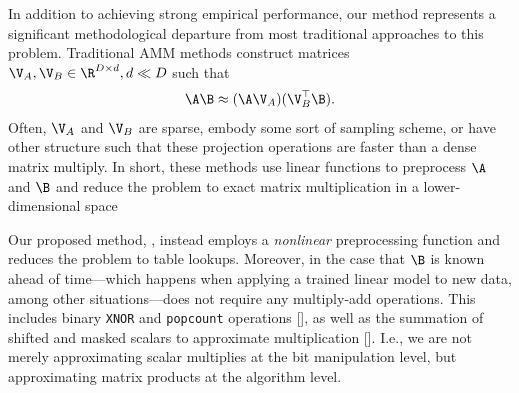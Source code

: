 
In addition to achieving strong empirical performance, our method represents a significant methodological departure from most traditional approaches to this problem. Traditional AMM methods construct matrices $\V_A, \V_B \in \R^{D \times d}, d \ll D$ such that
\begin{align}
    \A \B \approx (\A \V_A) (\V_B^\top \B).
\end{align}
Often, $\V_A$ and $\V_B$ are sparse, embody some sort of sampling scheme, or have other structure such that these projection operations are faster than a dense matrix multiply. In short, these methods use linear functions to preprocess $\A$ and $\B$ and reduce the problem to exact matrix multiplication in a lower-dimensional space

Our proposed method, \ours, instead employs a \textit{nonlinear} preprocessing function and reduces the problem to table lookups. Moreover, in the case that $\B$ is known ahead of time---which happens when applying a trained linear model to new data, among other situations---\oursp does not require any multiply-add operations. This includes binary \texttt{XNOR} and \texttt{popcount} operations [], as well as the summation of shifted and masked scalars to approximate multiplication []. I.e., we are not merely approximating scalar multiplies at the bit manipulation level, but approximating matrix products at the algorithm level.







